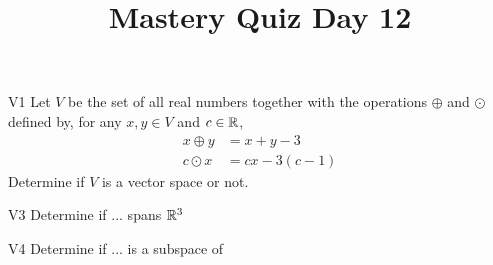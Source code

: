 \documentclass{sbgLAquiz}
\title{Mastery Quiz Day 12 }
\begin{document}
\begin{problem}{V1}
Let $V$ be the  set of all real numbers together with the operations $\oplus$ and $\odot$ defined by, for any $x,y \in V$ and $c \in \mathbb{R}$,
\begin{align*}
x\oplus y  &= x+y-3 \\
c \odot x &= cx-3(c-1)
\end{align*}
Determine if $V$ is a vector space or not.
\end{problem}

\begin{problem}{V3}
Determine if ... spans $\mathbb{R}^3$
\end{problem}
\newpage

\begin{problem}{V4}
Determine if ... is a subspace of
\end{problem}
\end{document}
